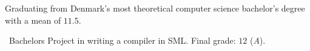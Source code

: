 
Graduating from Denmark's most theoretical computer science bachelor's degree with a mean of $11.5$.


\medskip

\faFileO\ Bachelors Project in writing a compiler in SML. Final grade: $12$ (\emph{A}).


